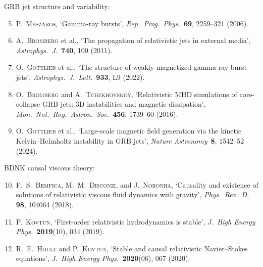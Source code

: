 \noindent
GRB jet structure and variability:
\begin{enumerate}
\setcounter{enumi}{4}
\item P.~\textsc{M\'esz\'aros}, `Gamma-ray bursts', \emph{Rep.\ Prog.\
  Phys.}\ \textbf{69}, 2259--321 (2006).

\item A.~\textsc{Bromberg} et al., `The propagation of relativistic
  jets in external media', \emph{Astrophys.\ J.}\ \textbf{740}, 100
  (2011).

\item O.~\textsc{Gottlieb} et al., `The structure of weakly
  magnetized gamma-ray burst jets', \emph{Astrophys.\ J.\ Lett.}\
  \textbf{933}, L9 (2022).

\item O.~\textsc{Bromberg} and A.~\textsc{Tchekhovskoy}, `Relativistic
  MHD simulations of core-collapse GRB jets: 3D instabilities and
  magnetic dissipation', \emph{Mon.\ Not.\ Roy.\ Astron.\ Soc.}\
  \textbf{456}, 1739--60 (2016).

\item O.~\textsc{Gottlieb} et al., `Large-scale magnetic field
  generation via the kinetic Kelvin--Helmholtz instability in GRB
  jets', \emph{Nature Astronomy}\ \textbf{8}, 1542--52 (2024).
\end{enumerate}

\noindent
BDNK causal viscous theory:
\begin{enumerate}
\setcounter{enumi}{9}
\item F.~S.~\textsc{Bemfica}, M.~M.~\textsc{Disconzi}, and
  J.~\textsc{Noronha}, `Causality and existence of solutions of
  relativistic viscous fluid dynamics with gravity',
  \emph{Phys.\ Rev.\ D}, \textbf{98}, 104064 (2018).

\item P.~\textsc{Kovtun}, `First-order relativistic hydrodynamics is
  stable', \emph{J.\ High Energy Phys.}\ \textbf{2019}(10), 034 (2019).

\item R.~E.~\textsc{Hoult} and P.~\textsc{Kovtun}, `Stable and causal
  relativistic Navier--Stokes equations', \emph{J.\ High Energy Phys.}\
  \textbf{2020}(06), 067 (2020).
\end{enumerate}
